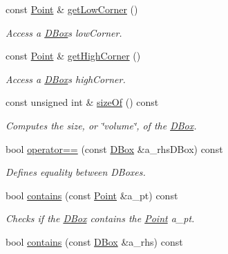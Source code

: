 \begin{DoxyCompactItemize}
const \hyperlink{class_point}{Point} \& \hyperlink{class_d_box_ab83ccd62bdb4c44e60027c6e745813f2}{get\+Low\+Corner} ()
\begin{DoxyCompactList}\small\item\em Access a \hyperlink{class_d_box}{D\+Box}\textquotesingle{}s low\+Corner. \end{DoxyCompactList}\item 
const \hyperlink{class_point}{Point} \& \hyperlink{class_d_box_a6737c8ca1c7b13a6a08e9488ae05dff9}{get\+High\+Corner} ()
\begin{DoxyCompactList}\small\item\em Access a \hyperlink{class_d_box}{D\+Box}\textquotesingle{}s high\+Corner. \end{DoxyCompactList}\item 
\mbox{\label{class_d_box_ae72c9edef6e3a49bd69fa3071990f5af}} 
const unsigned int \& \hyperlink{class_d_box_ae72c9edef6e3a49bd69fa3071990f5af}{size\+Of} () const
\begin{DoxyCompactList}\small\item\em Computes the size, or \char`\"{}volume\char`\"{}, of the \hyperlink{class_d_box}{D\+Box}. \end{DoxyCompactList}\item 
bool \hyperlink{class_d_box_ae4b6aec5cb444f68cc8273d5629296c4}{operator==} (const \hyperlink{class_d_box}{D\+Box} \&a\+\_\+rhs\+D\+Box) const
\begin{DoxyCompactList}\small\item\em Defines equality between D\+Boxes. \end{DoxyCompactList}\item 
\mbox{\label{class_d_box_aade93ec5c32f93b79f45c11e39d4a546}} 
bool \hyperlink{class_d_box_aade93ec5c32f93b79f45c11e39d4a546}{contains} (const \hyperlink{class_point}{Point} \&a\+\_\+pt) const
\begin{DoxyCompactList}\small\item\em Checks if the \hyperlink{class_d_box}{D\+Box} contains the \hyperlink{class_point}{Point} a\+\_\+pt. \end{DoxyCompactList}\item 
\mbox{\label{class_d_box_a73a7267ce2a7c8aba068a9c165605ad8}} 
bool \hyperlink{class_d_box_a73a7267ce2a7c8aba068a9c165605ad8}{contains} (const \hyperlink{class_d_box}{D\+Box} \&a\+\_\+rhs) const

\end{DoxyCompactItemize}
